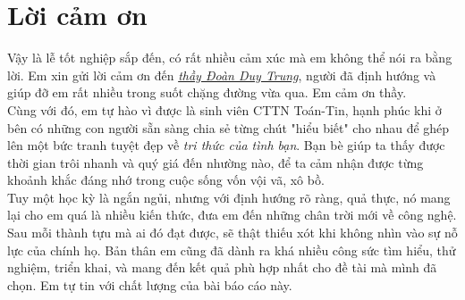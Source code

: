 \section*{
    \centering
    Lời cảm ơn
    \vspace{1.25cm}
}

Vậy là lễ tốt nghiệp sắp đến, có rất nhiều cảm xúc mà em không thể nói ra bằng lời. Em xin gửi lời cảm ơn đến \href{mailto:}{\textit{thầy Đoàn Duy Trung}}, người đã định hướng và giúp đỡ em rất nhiều trong suốt chặng đường vừa qua. Em cảm ơn thầy.\\

Cùng với đó, em tự hào vì được là sinh viên CTTN Toán-Tin, hạnh phúc khi ở bên có những con người sẵn sàng chia sẻ từng chút "hiểu biết" cho nhau để ghép lên một bức tranh tuyệt đẹp về \textit{tri thức của tình bạn}. Bạn bè giúp ta thấy được thời gian trôi nhanh và quý giá đến nhường nào, để ta cảm nhận được từng khoảnh khắc đáng nhớ trong cuộc sống vốn vội vã, xô bồ.\\

Tuy một học kỳ là ngắn ngủi, nhưng với định hướng rõ ràng, quả thực, nó mang lại cho em quá là nhiều kiến thức, đưa em đến những chân trời mới về công nghệ. Sau mỗi thành tựu mà ai đó đạt được, sẽ thật thiếu xót khi không nhìn vào sự nỗ lực của chính họ. Bản thân em cũng đã dành ra khá nhiều công sức tìm hiểu, thử nghiệm, triển khai, và mang đến kết quả phù hợp nhất cho đề tài mà mình đã chọn. Em tự tin với chất lượng của bài báo cáo này.\\
